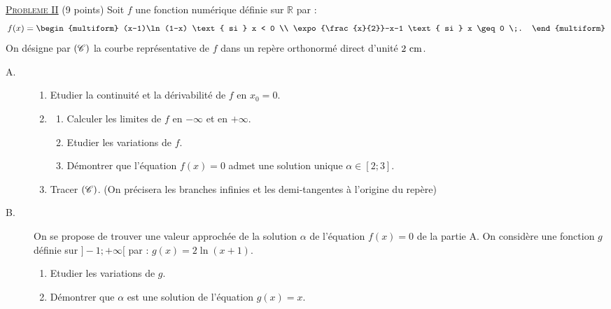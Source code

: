 \noindent \underline{\textsc{Probleme II}} (9 points) \newline
      Soit $f$ une fonction num\'erique d\'efinie sur $\mathbb{R}$ par :
      \[
      f(x) =
            \begin{multiform}
                  (x-1)\ln(1-x) \text{ si } x < 0 \\ 
                  \expo{\frac{x}{2}}-x-1 \text{ si } x \geq 0 \;.
            \end{multiform}
      \]
      On d\'esigne par $(\mathscr{C})$ la courbe repr\'esentative de $f$ dans un rep\`ere orthonorm\'e direct d'unit\'e $2~\mathrm{cm}$.
      \begin{description}
            \item[A. ]
                  \begin{enumerate}
                        \item Etudier la continuit\'e et la d\'erivabilit\'e de $f$ en $x_0=0$.
                        \item \begin{enumerate}
                                    \item Calculer les limites de $f$ en $-\infty$ et en $+\infty$.
                                    \item Etudier les variations de $f$.
                                    \item D\'emontrer que l'\'equation $f(x) = 0$ admet une solution unique $\alpha\in[2;3]$.
                              \end{enumerate}
                        \item Tracer $(\mathscr{C})$.
                              (On pr\'ecisera les branches infinies et les demi-tangentes \`a l'origine du rep\`ere)
                  \end{enumerate}
            \item[B. ]
                  On se propose de trouver une valeur approch\'ee de la 
                  solution $\alpha$ de l'\'equation $f(x) = 0$ de la partie A.
                  On consid\`ere une fonction $g$ d\'efinie sur $]-1;+\infty[$ par : $g(x) = 2 \ln (x+1)$.
                  \begin{enumerate}
                        \item Etudier les variations de $g$.
                        \item D\'emontrer que $\alpha$ est une solution de l'\'equation $g(x) = x$.

\end{enumerate}
\end{description}
